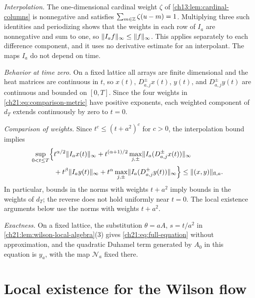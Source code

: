 \emph{Interpolation.} The one-dimensional cardinal weight $\zeta$ of \cref{ch13:lem:cardinal-columns} is nonnegative and satisfies $\sum_{m\in\mathbb Z}\zeta(u-m)=1$. Multiplying three such identities and periodizing shows that the weights in each row of $I_a$ are nonnegative and sum to one, so $\lVert I_af\rVert_\infty\le\lVert f\rVert_\infty$. This applies separately to each difference component, and it uses no derivative estimate for an interpolant. The maps $I_a$ do not depend on time.

\emph{Behavior at time zero.} On a fixed lattice all arrays are finite dimensional and the heat matrices are continuous in $t$, so $x(t)$, $D^{\pm}_{a,j}x(t)$, $y(t)$, and $D^{\pm}_{a,j}y(t)$ are continuous and bounded on $[0,T]$. Since the four weights in \eqref{ch21:eq:comparison-metric} have positive exponents, each weighted component of $d_T$ extends continuously by zero to $t=0$.

\emph{Comparison of weights.} Since $t^c\le(t+a^2)^c$ for $c>0$, the interpolation bound implies
\[
 \begin{split}
 \sup_{0<t\le T}\Bigl\{&t^{\alpha/2}\lVert I_ax(t)\rVert_\infty+t^{(\alpha+1)/2}\max_{j,\pm}\lVert I_a(D^{\pm}_{a,j}x(t))\rVert_\infty\\
 &+t^\beta\lVert I_ay(t)\rVert_\infty+t^\alpha\max_{j,\pm}\lVert I_a(D^{\pm}_{a,j}y(t))\rVert_\infty\Bigr\}\le\lVert (x,y)\rVert_{\mathrm{fl},a}.
 \end{split}
\]
In particular, bounds in the norms with weights $t+a^2$ imply bounds in the weights of $d_T$; the reverse does not hold uniformly near $t=0$. The local existence arguments below use the norms with weights $t+a^2$.

\emph{Exactness.} On a fixed lattice, the substitution $\theta=aA$, $s=t/a^2$ in \cref{ch21:lem:wilson-local-algebra}(3) gives \eqref{ch21:eq:full-equation} without approximation, and the quadratic Duhamel term generated by $A_0$ in this equation is $y_a$, with the map $\mathcal N_a$ fixed there.

\section{Local existence for the Wilson flow}\label{ch21:sec:local}


